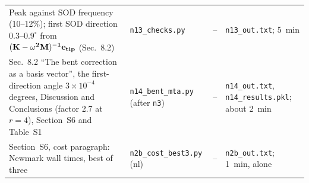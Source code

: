 \documentclass[10pt]{article}
\newcommand{\f}[1]{\texttt{#1}}
\begin{document}
\begin{longtable}{L{0.31\textwidth}L{0.25\textwidth}L{0.08\textwidth}L{0.25\textwidth}}
Peak against SOD frequency (10--12\%); first SOD direction $0.3$--$0.9^\circ$ from $(\bf K-\omega^2 M)^{-1}e_{tip}$ (Sec.~8.2) & \f{n13\_\allowbreak{}checks.py} & -- & \f{n13\_\allowbreak{}out.txt}; 5~min\\
Sec.~8.2 ``The bent correction as a basis vector'', the first-direction angle $3\times10^{-4}$ degrees, Discussion and Conclusions (factor 2.7 at $r=4$), Section~S6 and Table~S1 & \f{n14\_\allowbreak{}bent\_\allowbreak{}mta.py} (after \f{n3}) & -- & \f{n14\_\allowbreak{}out.txt}, \f{n14\_\allowbreak{}results.pkl}; about 2~min\\
Section~S6, cost paragraph: Newmark wall times, best of three & \f{n2b\_\allowbreak{}cost\_\allowbreak{}best3.py} (nl) & -- & \f{n2b\_\allowbreak{}out.txt}; 1~min, alone\\
\bottomrule
\end{longtable}
\end{document}
